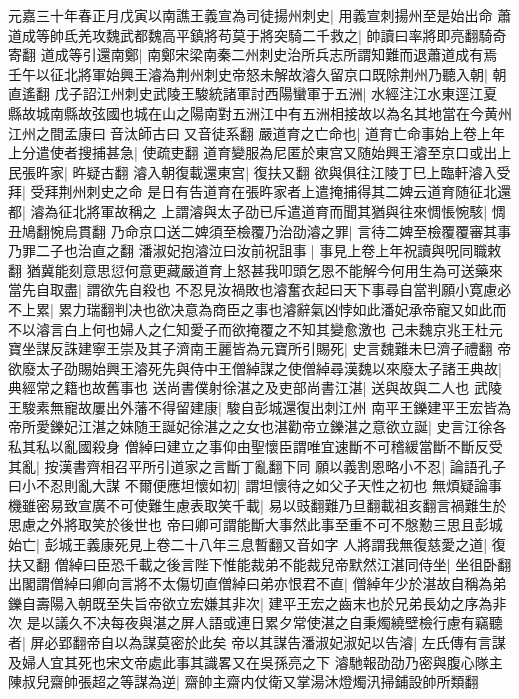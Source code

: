 元嘉三十年春正月戊寅以南譙王義宣為司徒揚州刺史|{
	用義宣刺揚州至是始出命}
蕭道成等帥氐羌攻魏武都魏高平鎮將苟莫于將突騎二千救之|{
	帥讀曰率將即亮翻騎奇寄翻}
道成等引還南鄭|{
	南鄭宋梁南秦二州刺史治所兵志所謂知難而退蕭道成有焉}
壬午以征北將軍始興王濬為荆州刺史帝怒未解故濬久留京口既除荆州乃聽入朝|{
	朝直遙翻}
戊子詔江州刺史武陵王駿統諸軍討西陽蠻軍于五洲|{
	水經注江水東逕江夏縣故城南縣故弦國也城在山之陽南對五洲江中有五洲相接故以為名其地當在今黄州江州之間孟康曰音汰師古曰又音徒系翻}
嚴道育之亡命也|{
	道育亡命事始上卷上年}
上分遣使者搜捕甚急|{
	使疏吏翻}
道育變服為尼匿於東宫又随始興王濬至京口或出上民張旿家|{
	旿疑古翻}
濬入朝復載還東宫|{
	復扶又翻}
欲與俱往江陵丁巳上臨軒濬入受拜|{
	受拜荆州刺史之命}
是日有告道育在張旿家者上遣掩捕得其二婢云道育随征北還都|{
	濬為征北將軍故稱之}
上謂濬與太子劭已斥遣道育而聞其猶與往來惆悵惋駭|{
	惆丑鳩翻惋烏貫翻}
乃命京口送二婢須至檢覆乃治劭濬之罪|{
	言待二婢至檢覆覆審其事乃罪二子也治直之翻}
潘淑妃抱濬泣曰汝前祝詛事|{
	事見上卷上年祝讀與呪同職敕翻}
猶冀能刻意思愆何意更藏嚴道育上怒甚我叩頭乞恩不能解今何用生為可送藥來當先自取盡|{
	謂欲先自殺也}
不忍見汝禍敗也濬奮衣起曰天下事尋自當判願小寛慮必不上累|{
	累力瑞翻判决也欲决意為商臣之事也濬辭氣凶悖如此潘妃承帝寵又如此而不以濬言白上何也婦人之仁知愛子而欲掩覆之不知其變愈激也}
己未魏京兆王杜元寶坐謀反誅建寧王崇及其子濟南王麗皆為元寶所引賜死|{
	史言魏難未巳濟子禮翻}
帝欲廢太子劭賜始興王濬死先與侍中王僧綽謀之使僧綽尋漢魏以來廢太子諸王典故|{
	典經常之籍也故舊事也}
送尚書僕射徐湛之及吏部尚書江湛|{
	送與故與二人也}
武陵王駿素無寵故屢出外藩不得留建康|{
	駿自彭城還復出刺江州}
南平王鑠建平王宏皆為帝所愛鑠妃江湛之妹随王誕妃徐湛之之女也湛勸帝立鑠湛之意欲立誕|{
	史言江徐各私其私以亂國殺身}
僧綽曰建立之事仰由聖懷臣謂唯宜速斷不可稽緩當斷不斷反受其亂|{
	按漢書齊相召平所引道家之言斷丁亂翻下同}
願以義割恩略小不忍|{
	論語孔子曰小不忍則亂大謀}
不爾便應坦懷如初|{
	謂坦懷待之如父子天性之初也}
無煩疑論事機雖密易致宣廣不可使難生慮表取笑千載|{
	易以豉翻難乃旦翻載祖亥翻言禍難生於思慮之外將取笑於後世也}
帝曰卿可謂能斷大事然此事至重不可不慇懃三思且彭城始亡|{
	彭城王義康死見上卷二十八年三息暫翻又音如字}
人將謂我無復慈愛之道|{
	復扶又翻}
僧綽曰臣恐千載之後言陛下惟能裁弟不能裁兒帝默然江湛同侍坐|{
	坐徂卧翻}
出閣謂僧綽曰卿向言將不太傷切直僧綽曰弟亦恨君不直|{
	僧綽年少於湛故自稱為弟}
鑠自壽陽入朝既至失旨帝欲立宏嫌其非次|{
	建平王宏之齒末也於兄弟長幼之序為非次}
是以議久不决每夜與湛之屏人語或連日累夕常使湛之自秉燭繞壁檢行慮有竊聽者|{
	屏必郢翻帝自以為謀莫密於此矣}
帝以其謀告潘淑妃淑妃以告濬|{
	左氏傳有言謀及婦人宜其死也宋文帝處此事其識畧又在吳孫亮之下}
濬馳報劭劭乃密與腹心隊主陳叔兒齋帥張超之等謀為逆|{
	齋帥主齋内仗衛又掌湯沐燈燭汛掃鋪設帥所類翻}
